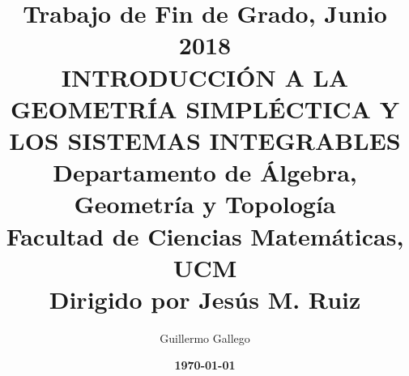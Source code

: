 \documentclass[12pt,a4paper,reqno]{amsart}
\begin{document}
\thispagestyle{plain}

\title[INTRODUCCIÓN A LA GEOMETRÍA SIMPLÉCTICA Y LOS SISTEMAS INTEGRABLES]{
{\rm\tiny Trabajo  \hspace{-1mm}de  \hspace{-1mm}Fin  \hspace{-1mm}de  \hspace{-1mm}Grado,  
\hspace{-1mm}Junio  \hspace{-1mm}2018}\\[8pt] 
INTRODUCCIÓN A LA GEOMETRÍA SIMPLÉCTICA Y LOS SISTEMAS INTEGRABLES\\[8pt]
{\rm\tiny Departamento \hspace{-1mm}de  \hspace{-1mm}Álgebra,  \hspace{-1mm}Geometría  \hspace{-1mm}y  \hspace{-1mm}Topología\\
Facultad  \hspace{-1mm}de  \hspace{-1mm}Ciencias \hspace{-1mm}Matem\'aticas,  \hspace{-1mm}UCM\\
{\rm\tiny Dirigido por Jes\'us M. Ruiz}
}}

\author{Guillermo Gallego}
\date{\textbf{ \today }}




\maketitle
\newpage
\setcounter{tocdepth}{1}
\tableofcontents



%


%
%

\nocite{*}


\end{document}
